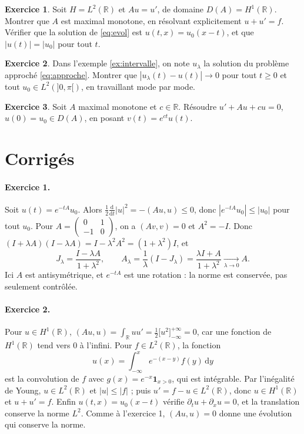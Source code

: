 \documentclass[11pt,a4paper]{article}
\theoremstyle{plain}
\theoremstyle{definition}
\newtheorem{exercice}{Exercice}
\theoremstyle{remark}
\newcommand{\R}{\mathbb{R}}
\newcommand{\dt}{\frac{\mathrm{d}}{\mathrm{d}t}}
\begin{document}
\begin{exercice}\label{exo:transport}
Soit $H=L^2(\R)$ et $Au=u'$, de domaine $D(A)=H^1(\R)$. Montrer que $A$ est maximal monotone, en résolvant explicitement $u+u'=f$. Vérifier que la solution de \eqref{eq:evol} est $u(t,x)=u_0(x-t)$, et que $|u(t)|=|u_0|$ pour tout $t$.
\end{exercice}

\begin{exercice}\label{exo:yosida}
Dans l'exemple \ref{ex:intervalle}, on note $u_\lambda$ la solution du problème approché \eqref{eq:approche}. Montrer que $|u_\lambda(t)-u(t)|\to0$ pour tout $t\geq0$ et tout $u_0\in L^2(]0,\pi[)$, en travaillant mode par mode.
\end{exercice}

\begin{exercice}\label{exo:decalage}
Soit $A$ maximal monotone et $c\in\R$. Résoudre $u'+Au+cu=0$, $u(0)=u_0\in D(A)$, en posant $v(t)=e^{ct}u(t)$.
\end{exercice}

\section{Corrigés}

\paragraph{Exercice 1.} Soit $u(t)=e^{-tA}u_0$. Alors $\frac12\dt|u|^2=-(Au,u)\leq0$, donc $|e^{-tA}u_0|\leq|u_0|$ pour tout $u_0$. Pour $A=\begin{pmatrix}0&1\\-1&0\end{pmatrix}$, on a $(Av,v)=0$ et $A^2=-I$. Donc $(I+\lambda A)(I-\lambda A)=I-\lambda^2A^2=(1+\lambda^2)I$, et
\[
  J_\lambda=\frac{I-\lambda A}{1+\lambda^2},\qquad
  A_\lambda=\frac1\lambda(I-J_\lambda)=\frac{\lambda I+A}{1+\lambda^2}\xrightarrow[\lambda\to0]{}A .
\]
Ici $A$ est antisymétrique, et $e^{-tA}$ est une rotation : la norme est conservée, pas seulement contrôlée.

\paragraph{Exercice 2.} Pour $u\in H^1(\R)$, $(Au,u)=\int_\R uu'=\frac12\big[u^2\big]_{-\infty}^{+\infty}=0$, car une fonction de $H^1(\R)$ tend vers $0$ à l'infini. Pour $f\in L^2(\R)$, la fonction
\[
  u(x)=\int_{-\infty}^xe^{-(x-y)}f(y)\,\mathrm{d}y
\]
est la convolution de $f$ avec $g(x)=e^{-x}\mathbf{1}_{x>0}$, qui est intégrable. Par l'inégalité de Young, $u\in L^2(\R)$ et $|u|\leq|f|$ ; puis $u'=f-u\in L^2(\R)$, donc $u\in H^1(\R)$ et $u+u'=f$. Enfin $u(t,x)=u_0(x-t)$ vérifie $\partial_tu+\partial_xu=0$, et la translation conserve la norme $L^2$. Comme à l'exercice 1, $(Au,u)=0$ donne une évolution qui conserve la norme.
\end{document}
